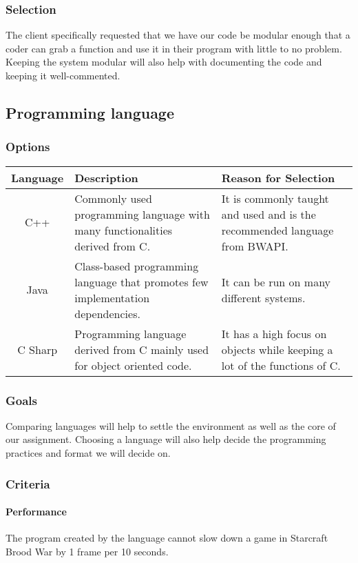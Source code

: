 \documentclass[10pt,letterpaper,onecolumn,draftclsnofoot]{IEEEtran}
\begin{document}
\subsubsection{Selection}
The client specifically requested that we have our code be modular enough that a coder can grab a function and use it in their program with little to no problem. Keeping the system modular will also help with documenting the code and keeping it well-commented.

\subsection{Programming language}
\subsubsection{Options}
\begin{center}
\begin{tabular}{ ||C|L|L|| } 
\hline
Language & Description & Reason for Selection \\
 \hline
 C++ & Commonly used programming language with many functionalities derived from C. & It is commonly taught and used and is the recommended language from BWAPI. \\ 
 \hline
 Java & Class-based programming language that promotes few implementation dependencies. & It can be run on many different systems.\\ 
 \hline
 C Sharp & Programming language derived from C mainly used for object oriented code. & It has a high focus on objects while keeping a lot of the functions of C. \\ 
 \hline
\end{tabular}
\end{center}

\subsubsection{Goals}
Comparing languages will help to settle the environment as well as the core of our assignment. Choosing a language will also help decide the programming practices and format we will decide on.

\subsubsection{Criteria}
\paragraph{Performance}
The program created by the language cannot slow down a game in Starcraft Brood War by 1 frame per 10 seconds.
\end{document}
